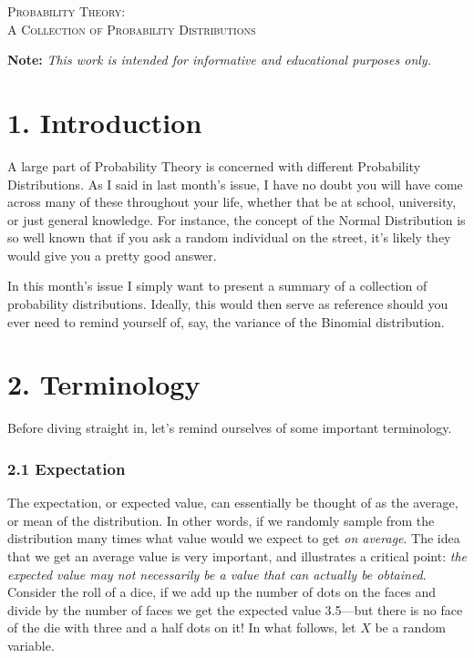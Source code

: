 \documentclass[11pt]{article}
\begin{document}

\begin{tcolorbox}
\begin{center}
    \large
    \textsc{Probability Theory: \\ A Collection of Probability Distributions}
\end{center}
\end{tcolorbox}

\begin{center}
\textbf{Note:} \textit{This work is intended for informative and educational purposes only.}
\end{center}

\section*{1. Introduction}
A large part of Probability Theory is concerned with different Probability Distributions. As I said in last month's issue, I have no doubt you will have come across many of these throughout your life, whether that be at school, university, or just general knowledge. For instance, the concept of the Normal Distribution is so well known that if you ask a random individual on the street, it's likely they would give you a pretty good answer.

In this month's issue I simply want to present a summary of a collection of probability distributions. Ideally, this would then serve as reference should you ever need to remind yourself of, say, the variance of the Binomial distribution.

\section*{2. Terminology}
Before diving straight in, let's remind ourselves of some important terminology.

\subsubsection*{2.1 Expectation}
The expectation, or expected value, can essentially be thought of as the average, or mean of the distribution. In other words, if we randomly sample from the distribution many times what value would we expect to get \textit{on average}. The idea that we get an average value is very important, and illustrates a critical point: \textit{the expected value may not necessarily be a value that can actually be obtained}. Consider the roll of a dice, if we add up the number of dots on the faces and divide by the number of faces we get the expected value 3.5––but there is no face of the die with three and a half dots on it! In what follows, let $X$ be a random variable.
\end{document}
